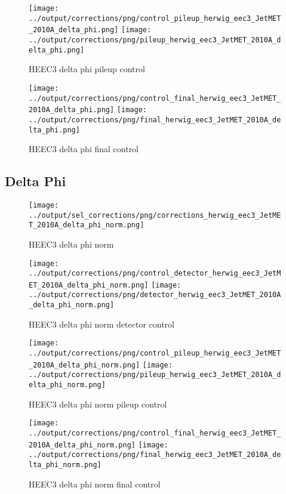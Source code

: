\documentclass[11pt]{book}
\begin{document}
\begin{figure}[ht]
\centering
\texttt{[image: ../output/corrections/png/control\_pileup\_herwig\_eec3\_JetMET\_2010A\_delta\_phi.png]}
\texttt{[image: ../output/corrections/png/pileup\_herwig\_eec3\_JetMET\_2010A\_delta\_phi.png]}
\caption{HEEC3 delta phi pileup control}
\label{fig:HEEC3_JetMET_2010A_delta_phi_pileup_control}
\end{figure}


\begin{figure}[ht]
\centering
\texttt{[image: ../output/corrections/png/control\_final\_herwig\_eec3\_JetMET\_2010A\_delta\_phi.png]}
\texttt{[image: ../output/corrections/png/final\_herwig\_eec3\_JetMET\_2010A\_delta\_phi.png]}
\caption{HEEC3 delta phi final control}
\label{fig:HEEC3_JetMET_2010A_delta_phi_final_control}
\end{figure}

\subsection{Delta Phi}
\begin{figure}[ht]
\centering
\texttt{[image: ../output/sel\_corrections/png/corrections\_herwig\_eec3\_JetMET\_2010A\_delta\_phi\_norm.png]}
\caption{HEEC3 delta phi norm}
\label{fig:HEEC3_JetMET_2010A_delta_phi_norm}
\end{figure}

\begin{figure}[ht]
\centering
\texttt{[image: ../output/corrections/png/control\_detector\_herwig\_eec3\_JetMET\_2010A\_delta\_phi\_norm.png]}
\texttt{[image: ../output/corrections/png/detector\_herwig\_eec3\_JetMET\_2010A\_delta\_phi\_norm.png]}
\caption{HEEC3 delta phi norm detector control}
\label{fig:HEEC3_JetMET_2010A_delta_phi_norm_detector_control}
\end{figure}

\begin{figure}[ht]
\centering
\texttt{[image: ../output/corrections/png/control\_pileup\_herwig\_eec3\_JetMET\_2010A\_delta\_phi\_norm.png]}
\texttt{[image: ../output/corrections/png/pileup\_herwig\_eec3\_JetMET\_2010A\_delta\_phi\_norm.png]}
\caption{HEEC3 delta phi norm pileup control}
\label{fig:HEEC3_JetMET_2010A_delta_phi_norm_pileup_control}
\end{figure}


\begin{figure}[ht]
\centering
\texttt{[image: ../output/corrections/png/control\_final\_herwig\_eec3\_JetMET\_2010A\_delta\_phi\_norm.png]}
\texttt{[image: ../output/corrections/png/final\_herwig\_eec3\_JetMET\_2010A\_delta\_phi\_norm.png]}
\caption{HEEC3 delta phi norm final control}
\label{fig:HEEC3_JetMET_2010A_delta_phi_norm_final_control}
\end{figure}
\end{document}
